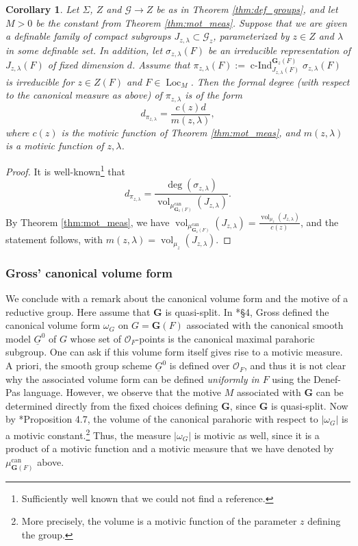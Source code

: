 \documentclass{amsart}
\newcommand{\cG}{\mathcal{G}}
\newcommand{\ri}{\mathcal{O}}
\DeclareMathOperator{\vol}{vol}
\DeclareMathOperator{\loc}{Loc}
\DeclareMathOperator{\ind}{c-Ind}
\newcommand{\bG}{\mathbf{G}}
\newcommand{\can}{\mathrm{can}}
\theoremstyle{plain}
\newtheorem{cor}[thm]{Corollary}
\theoremstyle{definition}
\begin{document}
\begin{cor} Let $\Sigma$, $Z$  and $\cG \to Z$ be as in Theorem \ref{thm:def_groups}, and let $M>0$ be the constant from Theorem \ref{thm:mot_meas}.
Suppose that we are given a definable family of compact subgroups $J_{z, \lambda} \subset \cG_z$,
parameterized by $z \in Z$ and $\lambda$ in some definable set.
In addition, let $\sigma_{z, \lambda}(F)$ be an irreducible representation of $J_{z, \lambda}(F)$ of fixed dimension $d$.
Assume that $\pi_{z,\lambda}(F) := \ind_{J_{z,\lambda}(F)}^{\bG_z(F)} \sigma_{z,\lambda}(F)$
is irreducible for $z \in Z(F)$ and $F \in \loc_M$.
Then the formal degree (with respect to the canonical measure as above) of $\pi_{z, \lambda}$ is of the form 
\[
d_{\pi_{z, \lambda}}=\frac{c(z)d}{m(z, \lambda)},
\]
where $c(z)$ is the motivic function of Theorem \ref{thm:mot_meas}, and $m(z, \lambda)$ is a motivic function of $z, \lambda$. 
\end{cor}
\begin{proof}
It is well-known\footnote{Sufficiently well known that we could not find a reference.} that
\[
d_{\pi_{z, \lambda}}=\frac{\deg(\sigma_{z, \lambda})}{\vol_{\mu_{\bG_z(F)}^\can}(J_{z, \lambda})}.
\]
By Theorem \ref{thm:mot_meas}, we have 
$\vol_{\mu_{\bG_z(F)}^\can}(J_{z, \lambda}) = \frac{\vol_{\mu_z}(J_{z, \lambda})}{c(z)}$,
and the statement follows, with $m(z, \lambda)=\vol_{\mu_z}(J_{z, \lambda})$.
\end{proof}

\subsubsection{Gross' canonical volume form}
We conclude with a remark about the canonical volume form and the motive of a reductive group. 
Here assume that $\bG$ is quasi-split. In  \cite{gross:97a}*{\S 4}, Gross defined the canonical volume form
$\omega_G$ on $G=\bG(F)$ associated with the canonical smooth model 
$\underline{G}^0$ of $G$ whose set of $\ri_F$-points is the canonical maximal parahoric subgroup. 
One can ask if this volume form itself gives rise to a motivic measure. 
A priori, the smooth group scheme $\underline{G}^0$ is defined over $\ri_F$, and thus it is not clear why the
associated volume form can be defined \emph{uniformly in $F$} using the Denef-Pas language.
However, we observe that the motive $M$ associated with $\bG$ can be determined directly from the fixed choices defining $\bG$,
since $\bG$ is quasi-split.
Now by \cite{gross:97a}*{Proposition 4.7}, the volume of the canonical parahoric with respect to $|\omega_G|$
is a motivic constant.\footnote{More precisely, the volume is a motivic function of the parameter $z$ defining the group.}  
Thus, the measure $|\omega_G|$ is motivic as well, since it is a product of a motivic function
and a motivic measure that we have denoted by $\mu_{\bG(F)}^\can$ above. 




\end{document}
